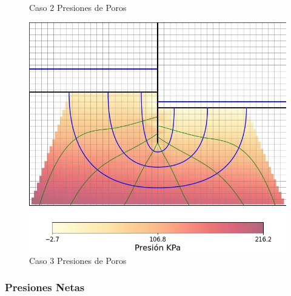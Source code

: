 \documentclass{article}
\begin{document}
\begin{figure}[H]
\begin{minipage}{0.32\textwidth}
      \caption{Caso 2 Presiones de Poros}
  \end{minipage}
  \begin{minipage}{0.32\textwidth}
      \centering
      \includegraphics[width=\textwidth]{FOTOS/caso_3_mapa_calor.jpg}
      \caption{Caso 3 Presiones de Poros}
  \end{minipage}
\end{figure}

\subsubsection{Presiones Netas}
\end{document}
